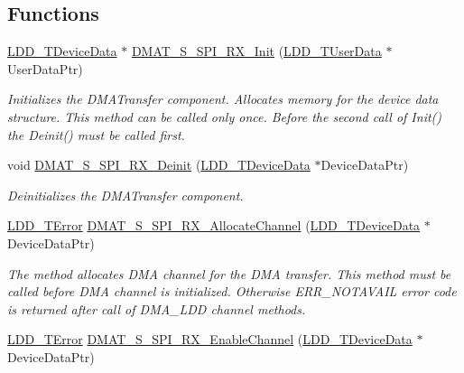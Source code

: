 \subsection*{Functions}
\begin{DoxyCompactItemize}
\item 
\hyperlink{group___p_e___types__module_gac5cf1362f1f0e3a2ce71b1bf2276d091}{L\-D\-D\-\_\-\-T\-Device\-Data} $\ast$ \hyperlink{group___d_m_a_t___s___s_p_i___r_x__module_ga37c9769ae1f8aef614b95ba793ef2025}{D\-M\-A\-T\-\_\-\-S\-\_\-\-S\-P\-I\-\_\-\-R\-X\-\_\-\-Init} (\hyperlink{group___p_e___types__module_ga0b66a73f87238a782318aa0be7578e35}{L\-D\-D\-\_\-\-T\-User\-Data} $\ast$User\-Data\-Ptr)
\begin{DoxyCompactList}\small\item\em Initializes the D\-M\-A\-Transfer component. Allocates memory for the device data structure. This method can be called only once. Before the second call of Init() the Deinit() must be called first. \end{DoxyCompactList}\item 
void \hyperlink{group___d_m_a_t___s___s_p_i___r_x__module_ga16f1590cbf4bf1389f07355381cfd605}{D\-M\-A\-T\-\_\-\-S\-\_\-\-S\-P\-I\-\_\-\-R\-X\-\_\-\-Deinit} (\hyperlink{group___p_e___types__module_gac5cf1362f1f0e3a2ce71b1bf2276d091}{L\-D\-D\-\_\-\-T\-Device\-Data} $\ast$Device\-Data\-Ptr)
\begin{DoxyCompactList}\small\item\em Deinitializes the D\-M\-A\-Transfer component. \end{DoxyCompactList}\item 
\hyperlink{group___p_e___types__module_ga24c2b045fd04e79e85f261ce4df35588}{L\-D\-D\-\_\-\-T\-Error} \hyperlink{group___d_m_a_t___s___s_p_i___r_x__module_gaa1162bc374403ec8d6774a0aaf124e8b}{D\-M\-A\-T\-\_\-\-S\-\_\-\-S\-P\-I\-\_\-\-R\-X\-\_\-\-Allocate\-Channel} (\hyperlink{group___p_e___types__module_gac5cf1362f1f0e3a2ce71b1bf2276d091}{L\-D\-D\-\_\-\-T\-Device\-Data} $\ast$Device\-Data\-Ptr)
\begin{DoxyCompactList}\small\item\em The method allocates D\-M\-A channel for the D\-M\-A transfer. This method must be called before D\-M\-A channel is initialized. Otherwise E\-R\-R\-\_\-\-N\-O\-T\-A\-V\-A\-I\-L error code is returned after call of D\-M\-A\-\_\-\-L\-D\-D channel methods. \end{DoxyCompactList}\item 
\hyperlink{group___p_e___types__module_ga24c2b045fd04e79e85f261ce4df35588}{L\-D\-D\-\_\-\-T\-Error} \hyperlink{group___d_m_a_t___s___s_p_i___r_x__module_ga09c8b0a8458086aff28098984a90fa08}{D\-M\-A\-T\-\_\-\-S\-\_\-\-S\-P\-I\-\_\-\-R\-X\-\_\-\-Enable\-Channel} (\hyperlink{group___p_e___types__module_gac5cf1362f1f0e3a2ce71b1bf2276d091}{L\-D\-D\-\_\-\-T\-Device\-Data} $\ast$Device\-Data\-Ptr)

\end{DoxyCompactItemize}
